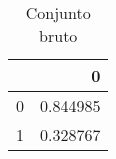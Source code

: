 \begin{table}
\centering
\caption{Conjunto bruto}
\label{Conjunto bruto 9}
\begin{tabular}{lr}
\toprule
{} &         0 \\
\midrule
0 &  0.844985 \\
1 &  0.328767 \\
\bottomrule
\end{tabular}
\end{table}
